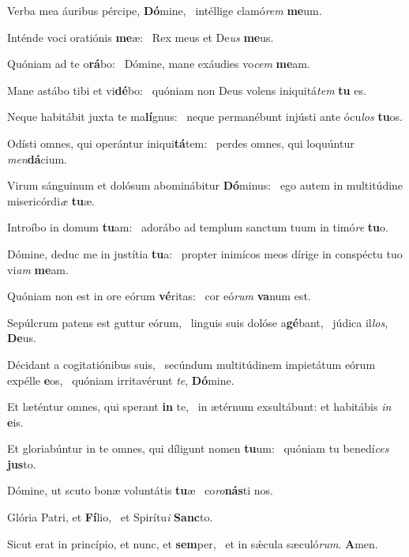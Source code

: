 \item Verba mea áuribus pércipe, \textbf{Dó}mine,~\psstar{} intéllige clamó\textit{rem} \textbf{me}um.
\item Inténde voci oratiónis \textbf{me}æ:~\psstar{} Rex meus et De\textit{us} \textbf{me}us.
\item Quóniam ad te o\textbf{rá}bo:~\psstar{} Dómine, mane exáudies vo\textit{cem} \textbf{me}am.
\item Mane astábo tibi et vi\textbf{dé}bo:~\psstar{} quóniam non Deus volens iniquitá\textit{tem} \textbf{tu} es.
\item Neque habitábit juxta te ma\textbf{lí}gnus:~\psstar{} neque permanébunt injústi ante ócu\textit{los} \textbf{tu}os.
\item Odísti omnes, qui operántur iniqui\textbf{tá}tem:~\psstar{} perdes omnes, qui loquúntur \textit{men}\textbf{dá}cium.
\item Virum sánguinum et dolósum abominábitur \textbf{Dó}minus:~\psstar{} ego autem in multitúdine misericórdi\textit{æ} \textbf{tu}æ.
\item Introíbo in domum \textbf{tu}am:~\psstar{} adorábo ad templum sanctum tuum in timó\textit{re} \textbf{tu}o.
\item Dómine, deduc me in justítia \textbf{tu}a:~\psstar{} propter inimícos meos dírige in conspéctu tuo vi\textit{am} \textbf{me}am.
\item Quóniam non est in ore eórum \textbf{vé}ritas:~\psstar{} cor eó\textit{rum} \textbf{va}num est.
\item Sepúlcrum patens est guttur eórum,~\pscross{} linguis suis dolóse a\textbf{gé}bant,~\psstar{} júdica il\textit{los}, \textbf{De}us.
\item Décidant a cogitatiónibus suis,~\pscross{} secúndum multitúdinem impietátum eórum expélle \textbf{e}os,~\psstar{} quóniam irritavérunt \textit{te}, \textbf{Dó}mine.
\item Et læténtur omnes, qui sperant \textbf{in} te,~\psstar{} in ætérnum exsultábunt: et habitábis \textit{in} \textbf{e}is.
\item Et gloriabúntur in te omnes, qui díligunt nomen \textbf{tu}um:~\psstar{} quóniam tu benedí\textit{ces} \textbf{jus}to.
\item Dómine, ut scuto bonæ voluntátis \textbf{tu}æ~\psstar{} co\textit{ro}\textbf{nás}ti nos.
\item Glória Patri, et \textbf{Fí}lio,~\psstar{} et Spirítu\textit{i} \textbf{Sanc}to.
\item Sicut erat in princípio, et nunc, et \textbf{sem}per,~\psstar{} et in sǽcula sæculó\textit{rum}. \textbf{A}men.
